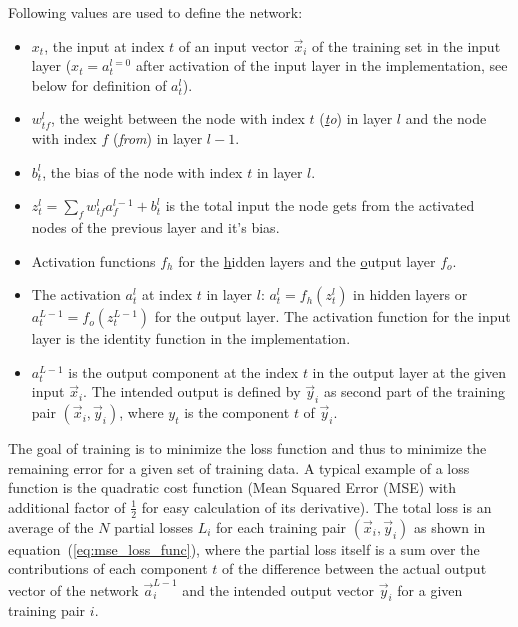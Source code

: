 Following values are used to define the network:
\begin{itemize}
    \item $x_t$, the input at index $t$ of an input vector $\vec{x}_i$ of the training set
    in the input layer ($x_t = a^{l=0}_t$ after activation of the input layer in the
    implementation, see below for definition of $a^l_t$).

    \item $w^l_{tf}$, the weight between the node with index $t$ (\emph{\underline{t}o})
    in layer $l$ and the node with index $f$ (\emph{\underline{f}rom}) in layer $l-1$.

    \item $b^l_t$, the bias of the node with index $t$ in layer $l$.
    
    \item $z^l_t = \sum_{f}{w^l_{tf} a^{l-1}_f} + b^l_t$ is the total input the node gets
    from the activated nodes of the previous layer and it's bias.
    
    \item Activation functions $f_h$ for the \underline{h}idden layers and the
    \underline{o}utput layer $f_o$.
    
    \item The activation $a^l_t$ at index $t$ in layer $l$: $a^l_t = f_h(z^l_t)$ in hidden
    layers or $a^{L-1}_t = f_o(z^{L-1}_t)$ for the output layer. The activation function
    for the input layer is the identity function in the implementation.

    \item $a^{L-1}_t$ is the output component at the index $t$ in the output layer at the
    given input $\vec{x}_i$. The intended output is defined by $\vec{y}_i$ as second part
    of the training pair $(\vec{x}_i, \vec{y}_i)$, where $y_t$ is the component $t$ of
    $\vec{y}_i$.
\end{itemize}

The goal of training is to minimize the loss function and thus to minimize the remaining
error for a given set of training data.  A typical example of a loss function is the
quadratic cost function (Mean Squared Error (MSE) with additional factor of $\frac{1}{2}$
for easy calculation of its derivative). The total loss is an average of the $N$ partial
losses $L_i$ for each training pair $(\vec{x}_i, \vec{y}_i)$ as shown in
equation~(\ref{eq:mse_loss_func}), where the partial loss itself is a sum over the
contributions of each component $t$ of the difference between the actual output vector of
the network $\vec{a}^{L-1}_i$ and the intended output vector $\vec{y}_i$ for a given
training pair $i$.

